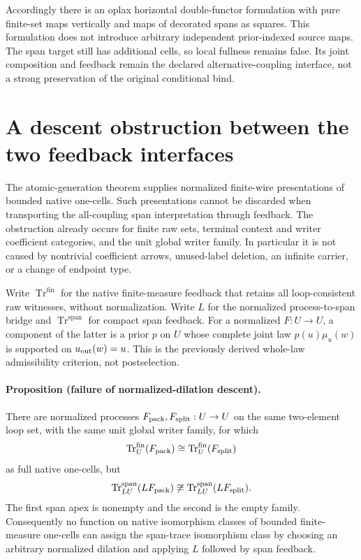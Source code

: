 \documentclass[11pt]{article}
\begin{document}
Accordingly there is an oplax horizontal double-functor formulation with pure finite-set maps vertically and maps of decorated spans as squares. This formulation does not introduce arbitrary independent prior-indexed source maps. The span target still has additional cells, so local fullness remains false. Its joint composition and feedback remain the declared alternative-coupling interface, not a strong preservation of the original conditional bind.

\section{A descent obstruction between the two feedback interfaces}
\label{sec:dilation-descent}

The atomic-generation theorem supplies normalized finite-wire presentations of bounded native one-cells. Such presentations cannot be discarded when transporting the all-coupling span interpretation through feedback. The obstruction already occurs for finite raw sets, terminal context and writer coefficient categories, and the unit global writer family. In particular it is not caused by nontrivial coefficient arrows, unused-label deletion, an infinite carrier, or a change of endpoint type.

Write $\operatorname{Tr}^{\mathrm{fin}}$ for the native finite-measure feedback that retains all loop-consistent raw witnesses, without normalization. Write $L$ for the normalized process-to-span bridge and $\operatorname{Tr}^{\mathrm{span}}$ for compact span feedback. For a normalized $F:U\to U$, a component of the latter is a prior $p$ on $U$ whose complete joint law $p(u)\mu_u(w)$ is supported on $u_{\rm out}(w)=u$. This is the previously derived whole-law admissibility criterion, not postselection.

\paragraph{Proposition (failure of normalized-dilation descent).}
There are normalized processes $F_{\rm pack},F_{\rm split}:U\to U$ on the same two-element loop set, with the same unit global writer family, for which
\[
 \operatorname{Tr}^{\mathrm{fin}}_U(F_{\rm pack})
 \cong \operatorname{Tr}^{\mathrm{fin}}_U(F_{\rm split})
\]
as full native one-cells, but
\[
 \operatorname{Tr}^{\mathrm{span}}_{LU}(LF_{\rm pack})
 \not\cong
 \operatorname{Tr}^{\mathrm{span}}_{LU}(LF_{\rm split}).
\]
The first span apex is nonempty and the second is the empty family. Consequently no function on native isomorphism classes of bounded finite-measure one-cells can assign the span-trace isomorphism class by choosing an arbitrary normalized dilation and applying $L$ followed by span feedback.
\end{document}

